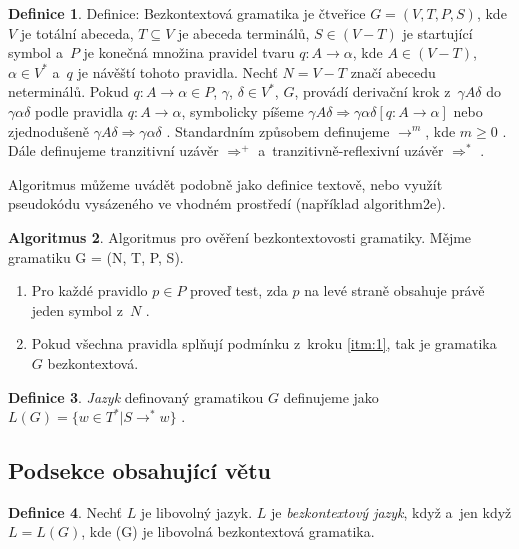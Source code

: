 \documentclass[a4paper, 11pt, times]{article}
\theoremstyle{definition}
\newtheorem{definition}{Definice}[section]
\theoremstyle{theorem}
\newtheorem{theorem}[definition]{Algoritmus}
\theoremstyle{remark}
\begin{document}
\begin{twocolumn}
  \begin{definition}  
  Definice: Bezkontextová gramatika je čtveřice $G=(V, T, P, S)$, kde $V$ je totální abeceda,
  $T \subseteq V$ je abeceda terminálů, $S \in (V-T)$ je startující symbol a~$P$ je konečná množina pravidel
  tvaru $q: A \rightarrow \alpha$, kde $A \in (V-T)$, $\alpha \in V^*$ a~$q$
  je návěští tohoto pravidla. Nechť $N=V-T$ značí abecedu neterminálů.
  Pokud $q: A \rightarrow \alpha \in P$, $\gamma$, $\delta \in V^*$, $G$,
  provádí derivační krok z~$\gamma A \delta$ do $\gamma \alpha \delta$ podle pravidla $q: A \rightarrow \alpha$,
  symbolicky píšeme $\gamma A \delta \Rightarrow \gamma \alpha \delta [q: A \rightarrow \alpha] $
  nebo zjednodušeně $\gamma A \delta \Rightarrow \gamma \alpha \delta$ .
  Standardním způsobem definujeme $\rightarrow^m$, kde $m \geq 0$ . Dále definujeme
  tranzitivní uzávěr $\Rightarrow^+$ a~tranzitivně-reflexivní uzávěr $\Rightarrow^*$ .
  \end{definition}

  Algoritmus můžeme uvádět podobně jako definice textově, nebo využít pseudokódu
  vysázeného ve vhodném prostředí (například algorithm2e).


  \begin{theorem} 
  Algoritmus pro ověření bezkontextovosti gramatiky. Mějme gramatiku G = (N, T, P, S).
  \begin{enumerate}
    \item Pro každé pravidlo $p \in P$ proveď test, zda $p$ na levé straně obsahuje právě jeden symbol z~$N$ .
    \label{itm:1}
    \item Pokud všechna pravidla splňují podmínku z~kroku \ref{itm:1}, tak je gramatika $G$ bezkontextová.
 \end{enumerate}
 \end{theorem}


  \begin{definition}
  \textit{Jazyk} definovaný gramatikou $G$ definujeme jako $L(G)=\{w \in T^*|S \rightarrow^* w \}$ .
  \end{definition}


  \subsection{Podsekce obsahující větu}
  \label{subsec:1}


  \begin{definition} 
  Nechť $L$ je libovolný jazyk. $L$ je \textit{bezkontextový jazyk}, když a~jen
  když $L=L(G)$, kde (G) je libovolná bezkontextová gramatika.
  \end{definition}



\end{twocolumn}
\end{document}
